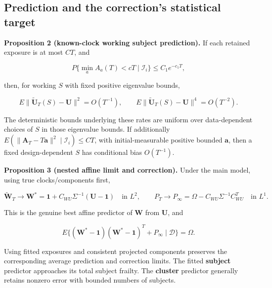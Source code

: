 \documentclass[11pt]{article}
\begin{document}
\subsection{Prediction and the correction's statistical target}\label{sec:4.5}

\label{res:Proposition-2}
\textbf{Proposition 2 (known-clock working subject prediction).} If each retained exposure is at most \(CT\), and

\begin{equation*}
P\{\min_a A_a(T)<cT\mid\mathcal I_i\}\leq C_1e^{-c_1T},
\tag{56}\label{eq:56}
\end{equation*}

then, for working \(S\) with fixed positive eigenvalue bounds,

\begin{equation*}
E\|\widetilde{\mathbf U}_T(S)-\mathbf U\|^2=O(T^{-1}),\qquad
E\|\widetilde{\mathbf U}_T(S)-\mathbf U\|^4=O(T^{-2}).
\tag{57}\label{eq:57}
\end{equation*}

The deterministic bounds underlying these rates are uniform over data-dependent choices of \(S\) in those eigenvalue bounds. If additionally
\(E(\|\mathbf A_T-T\mathbf a\|^2\mid\mathcal I_i)\leq CT\), with initial-measurable positive bounded \(\mathbf a\), then a fixed design-dependent \(S\) has conditional bias \(O(T^{-1})\).

\label{res:Proposition-3}
\textbf{Proposition 3 (nested affine limit and correction).} Under the main model, using true clocks/components first,

\begin{equation*}
\widetilde{\mathbf W}_T\longrightarrow
\mathbf W^*=\mathbf1+C_{WU}\Sigma^{-1}(\mathbf U-\mathbf1)
\quad\text{in }L^2,\qquad
P_T\longrightarrow P_\infty=\Omega-C_{WU}\Sigma^{-1}C_{WU}^T
\quad\text{in }L^1.
\tag{58}\label{eq:58}
\end{equation*}

This is the genuine best affine predictor of \(\mathbf W\) from \(\mathbf U\), and

\begin{equation*}
E\{(\mathbf W^*-\mathbf1)(\mathbf W^*-\mathbf1)^T+P_\infty
 \mid\mathcal D\}=\Omega.
\tag{59}\label{eq:59}
\end{equation*}

Using fitted exposures and consistent projected components preserves the corresponding average prediction and correction limits. The fitted \textbf{subject} predictor approaches its total subject frailty. The \textbf{cluster} predictor generally retains nonzero error with bounded numbers of subjects.
\end{document}
